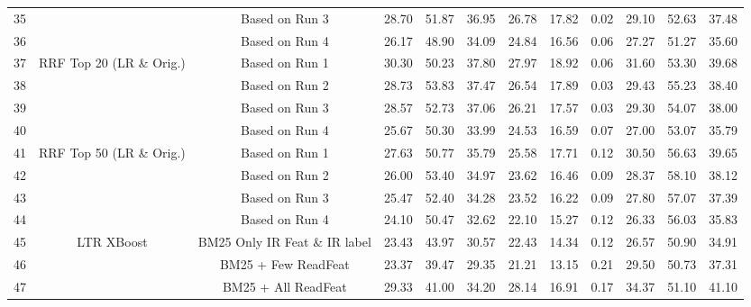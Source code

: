 \begin{table}
{\begin{tabular}{c|c|c|ccc|cc|c|ccc}
35 &  & Based on Run 3 & 28.70 & 51.87 & 36.95 & 26.78 & 17.82 & 0.02 & 29.10 & 52.63 & 37.48\tabularnewline
36 &  & Based on Run 4 & 26.17 & 48.90 & 34.09 & 24.84 & 16.56 & 0.06 & 27.27 & 51.27 & 35.60\tabularnewline
\midrule 
37 & \multirow{4}{*}{RRF Top 20 (LR \& Orig.)} & Based on Run 1 & 30.30 & 50.23 & 37.80 & 27.97 & 18.92 & 0.06 & 31.60 & 53.30 & 39.68\tabularnewline
38 &  & Based on Run 2 & 28.73 & 53.83 & 37.47 & 26.54 & 17.89 & 0.03 & 29.43 & 55.23 & 38.40\tabularnewline
39 &  & Based on Run 3 & 28.57 & 52.73 & 37.06 & 26.21 & 17.57 & 0.03 & 29.30 & 54.07 & 38.00\tabularnewline
40 &  & Based on Run 4 & 25.67 & 50.30 & 33.99 & 24.53 & 16.59 & 0.07 & 27.00 & 53.07 & 35.79\tabularnewline
\midrule 
41 & \multirow{4}{*}{RRF Top 50 (LR \& Orig.)} & Based on Run 1 & 27.63 & 50.77 & 35.79 & 25.58 & 17.71 & 0.12 & 30.50 & 56.63 & 39.65\tabularnewline
42 &  & Based on Run 2 & 26.00 & 53.40 & 34.97 & 23.62 & 16.46 & 0.09 & 28.37 & 58.10 & 38.12\tabularnewline
43 &  & Based on Run 3 & 25.47 & 52.40 & 34.28 & 23.52 & 16.22 & 0.09 & 27.80 & 57.07 & 37.39\tabularnewline
44 &  & Based on Run 4 & 24.10 & 50.47 & 32.62 & 22.10 & 15.27 & 0.12 & 26.33 & 56.03 & 35.83\tabularnewline
\midrule 
45 & LTR XBoost & BM25 Only IR Feat \& IR label & 23.43 & 43.97 & 30.57 & 22.43 & 14.34 & 0.12 & 26.57 & 50.90 & 34.91\tabularnewline
46 &  & BM25 + Few ReadFeat & 23.37 & 39.47 & 29.35 & 21.21 & 13.15 & 0.21 & 29.50 & 50.73 & 37.31\tabularnewline
47 &  & BM25 + All ReadFeat & 29.33 & 41.00 & 34.20 & 28.14 & 16.91 & 0.17 & 34.37 & 51.10 & 41.10\tabularnewline
\bottomrule 
\end{tabular}
%
} %
\end{table}
